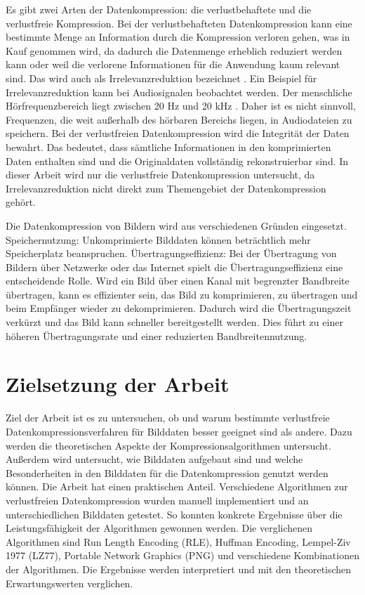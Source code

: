 \documentclass[conference]{IEEEtran}
\begin{document}
Es gibt zwei Arten der Datenkompression: die verlustbehaftete und die verlustfreie Kompression.
Bei der verlustbehafteten Datenkompression kann eine bestimmte Menge an Information durch die
Kompression verloren gehen, was in Kauf genommen wird, da dadurch die Datenmenge erheblich
reduziert werden kann oder weil die verlorene Informationen für die Anwendung kaum relevant sind.
Das wird auch als Irrelevanzreduktion bezeichnet \cite{Maluck}.
Ein Beispiel für Irrelevanzreduktion kann bei Audiosignalen beobachtet werden.
Der menschliche Hörfrequenzbereich liegt zwischen 20 Hz und 20 kHz \cite{Burke}.
Daher ist es nicht sinnvoll, Frequenzen, die weit außerhalb des hörbaren Bereichs liegen,
in Audiodateien zu speichern.
Bei der verlustfreien Datenkompression wird die Integrität der Daten bewahrt.
Das bedeutet, dass sämtliche Informationen in den komprimierten Daten enthalten sind
und die Originaldaten vollständig rekonstruierbar sind.
In dieser Arbeit wird nur die verlustfreie Datenkompression untersucht, da
Irrelevanzreduktion nicht direkt zum Themengebiet der Datenkompression gehört.

Die Datenkompression von Bildern wird aus verschiedenen Gründen eingesetzt.
Speichernutzung: Unkomprimierte Bilddaten können beträchtlich mehr Speicherplatz beanspruchen.
Übertragungseffizienz: Bei der Übertragung von Bildern über Netzwerke oder das Internet spielt
die Übertragungseffizienz eine entscheidende Rolle.
Wird ein Bild über einen Kanal mit begrenzter Bandbreite übertragen, kann es effizienter sein, 
das Bild zu komprimieren, zu übertragen und beim Empfänger wieder zu dekomprimieren.
Dadurch wird die Übertragungszeit verkürzt und das Bild kann schneller bereitgestellt werden.
Dies führt zu einer höheren Übertragungsrate und einer reduzierten Bandbreitennutzung.


\section{Zielsetzung der Arbeit}

Ziel der Arbeit ist es zu untersuchen, ob und warum bestimmte verlustfreie
Datenkompressionsverfahren für Bilddaten besser geeignet sind als andere.
Dazu werden die theoretischen Aspekte der Kompressionsalgorithmen untersucht.
Außerdem wird untersucht, wie Bilddaten aufgebaut sind und welche Besonderheiten
in den Bilddaten für die Datenkompression genutzt werden können.
Die Arbeit hat einen praktischen Anteil.
Verschiedene Algorithmen zur verlustfreien Datenkompression wurden manuell
implementiert und an unterschiedlichen Bilddaten getestet.
So konnten konkrete Ergebnisse über die Leistungsfähigkeit der Algorithmen gewonnen werden.
Die verglichenen Algorithmen sind Run Length Encoding (RLE), Huffman Encoding,
Lempel-Ziv 1977 (LZ77), Portable Network Graphics (PNG) und verschiedene 
Kombinationen der Algorithmen.
Die Ergebnisse werden interpretiert und mit den theoretischen Erwartungswerten verglichen.
\end{document}
